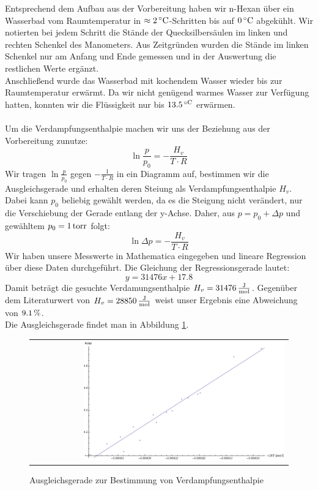 \documentclass[a4paper,titlepage]{scrartcl}
\numberwithin{equation}{section}
\begin{document}
Entsprechend dem Aufbau aus der Vorbereitung haben wir n-Hexan über ein Wasserbad vom Raumtemperatur in $\approx \unit[2]{^{\circ} C}$-Schritten bis auf $\unit[0]{^{\circ} C}$ abgekühlt. Wir notierten bei jedem Schritt die Stände der Quecksilbersäulen im linken und rechten Schenkel des Manometers. Aus Zeitgründen wurden die Stände im linken Schenkel nur am Anfang und Ende gemessen und in der Auswertung die restlichen Werte ergänzt.\\
Anschließend wurde das Wasserbad mit kochendem Wasser wieder bis zur Raumtemperatur erwärmt. Da wir nicht genügend warmes Wasser zur Verfügung hatten, konnten wir die Flüssigkeit nur bis $\unit[13.5]{^{\circ C}}$ erwärmen.\\ \\
Um die Verdampfungsenthalpie machen wir uns der Beziehung aus der Vorbereitung zunutze:
\begin{equation*}
\ln{\frac{p}{p_0}}=-\frac{H_v}{T \cdot R}
\end{equation*}
Wir tragen $\ln{\frac{p}{p_0}}$ gegen $-\frac{1}{T \cdot R}$ in ein Diagramm auf, bestimmen wir die Ausgleichsgerade und erhalten deren Steiung als Verdampfungsenthalpie $H_v$. Dabei kann $p_0$ beliebig gewählt werden, da es die Steigung nicht verändert, nur die Verschiebung der Gerade entlang der y-Achse. Daher, aus $p=p_0+\Delta p$ und gewähltem $p_0=\unit[1]{torr}$ folgt:
\begin{equation}
\ln{\Delta p}=-\frac{H_v}{T \cdot R}
\end{equation} 
Wir haben unsere Messwerte in Mathematica eingegeben und lineare Regression über diese Daten durchgeführt. Die Gleichung der Regressionsgerade lautet:
\begin{equation*}
y=31476x + 17.8
\end{equation*}
Damit beträgt die gesuchte Verdamungsenthalpie $H_v=\unit[31476]{\frac{J}{mol}}$. Gegenüber dem Literaturwert von $H_v=\unit[28850]{\frac{J}{mol}}$ weist unser Ergebnis eine Abweichung von $\unit[9.1]{\%}$.\\
Die Ausgleichsgerade findet man in Abbildung \ref{fig:aufgabe41}.
\begin{figure}[H]
	\centering
	\begin{tabular}{@{}r@{}}
		\includegraphics[width=0.8\textwidth]{bilder/aufgabe41.png}\\
	\end{tabular}
	\caption{Ausgleichsgerade zur Bestimmung von Verdampfungsenthalpie}
	\label{fig:aufgabe41}
\end{figure}



\end{document}
